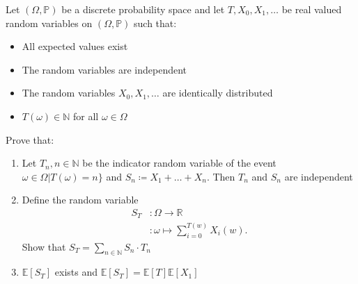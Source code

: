 \begin{problem}
  Let $(\Omega, \mathbb{P})$ be a discrete probability space and let $T, X_{0}, X_{1}, \ldots$ be real valued random variables on $(\Omega, \mathbb{P})$ such that:
  \begin{itemize}
    \item All expected values exist
    \item The random variables are independent
    \item The random variables $X_{0}, X_{1}, \ldots$ are identically distributed
    \item $T(\omega) \in \mathbb{N}$ for all $\omega \in \Omega$
  \end{itemize}
  Prove that:
  \begin{enumerate}[label=(\roman*)]  
  \item Let $T_{n}, n \in \mathbb{N}$ be the indicator random variable of the event $\omega \in \Omega | T(\omega) = n\}$ and $S_{n} \coloneqq X_{1} + \ldots + X_{n}$. Then $T_{n}$ and $S_{n}$ are independent
  \item Define the random variable
    \begin{align*}
      S_{T} &: \Omega \to \mathbb{R} \\
            &: \omega \mapsto \sum_{i=0}^{T(w)} X_{i}(w).
    \end{align*}
    Show that $S_{T} = \sum_{n \in \mathbb{N}} S_{n} \cdot T_{n}$
  \item $\mathbb{E}[S_{T}]$ exists and $\mathbb{E}[S_{T}] = \mathbb{E}[T] \mathbb{E}[X_{1}]$
  \end{enumerate}
\end{problem}

